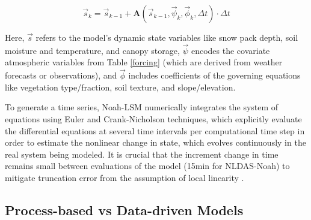 \begin{equation}\label{dynamical}
    \vec{s}_k = \vec{s}_{k-1} + \mathbf{A}(\vec{s}_{k-1}, \vec{\psi}_k, \vec{\phi}_k, \Delta t) \cdot \Delta t
\end{equation}


Here, $\vec{s}$ refers to the model's dynamic state variables like snow pack depth, soil moisture and temperature, and canopy storage, $\vec{\psi}$ encodes the covariate atmospheric variables from Table \ref{forcing} (which are derived from weather forecasts or observations), and $\vec{\phi}$ includes coefficients of the governing equations like vegetation type/fraction, soil texture, and slope/elevation.

To generate a time series, Noah-LSM numerically integrates the system of equations using Euler and Crank-Nicholson techniques, which explicitly evaluate the differential equations at several time intervals per computational time step in order to estimate the nonlinear change in state, which evolves continuously in the real system being modeled. It is crucial that the increment change in time remains small between evaluations of the model (15min for NLDAS-Noah) to mitigate truncation error from the assumption of local linearity \citep{mitchell_multi-institution_2004} \citep{cartwright_dynamics_1992}.

\subsection{Process-based vs Data-driven Models}


